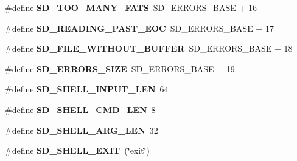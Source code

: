 \begin{DoxyCompactItemize}
\item 
\hypertarget{group__sd__public_ga5017b3273c66c328264e9c4f565df36e}{\#define {\bfseries \-S\-D\-\_\-\-T\-O\-O\-\_\-\-M\-A\-N\-Y\-\_\-\-F\-A\-T\-S}~\-S\-D\-\_\-\-E\-R\-R\-O\-R\-S\-\_\-\-B\-A\-S\-E + 16}\label{group__sd__public_ga5017b3273c66c328264e9c4f565df36e}

\item 
\hypertarget{group__sd__public_ga9e554ff6dbb9ada7d94a896533f96796}{\#define {\bfseries \-S\-D\-\_\-\-R\-E\-A\-D\-I\-N\-G\-\_\-\-P\-A\-S\-T\-\_\-\-E\-O\-C}~\-S\-D\-\_\-\-E\-R\-R\-O\-R\-S\-\_\-\-B\-A\-S\-E + 17}\label{group__sd__public_ga9e554ff6dbb9ada7d94a896533f96796}

\item 
\hypertarget{group__sd__public_gad7281660fcc6b8fdfbc982fb2e261e8d}{\#define {\bfseries \-S\-D\-\_\-\-F\-I\-L\-E\-\_\-\-W\-I\-T\-H\-O\-U\-T\-\_\-\-B\-U\-F\-F\-E\-R}~\-S\-D\-\_\-\-E\-R\-R\-O\-R\-S\-\_\-\-B\-A\-S\-E + 18}\label{group__sd__public_gad7281660fcc6b8fdfbc982fb2e261e8d}

\item 
\hypertarget{group__sd__public_ga3cb8d9a3b08f02a70a48e891cc27e05b}{\#define {\bfseries \-S\-D\-\_\-\-E\-R\-R\-O\-R\-S\-\_\-\-S\-I\-Z\-E}~\-S\-D\-\_\-\-E\-R\-R\-O\-R\-S\-\_\-\-B\-A\-S\-E + 19}\label{group__sd__public_ga3cb8d9a3b08f02a70a48e891cc27e05b}

\item 
\hypertarget{group__sd__public_ga1fae78f046859f365629f8f0622cb6c1}{\#define {\bfseries \-S\-D\-\_\-\-S\-H\-E\-L\-L\-\_\-\-I\-N\-P\-U\-T\-\_\-\-L\-E\-N}~64}\label{group__sd__public_ga1fae78f046859f365629f8f0622cb6c1}

\item 
\hypertarget{group__sd__public_ga09e51228e75ddc9f72fc095a28050228}{\#define {\bfseries \-S\-D\-\_\-\-S\-H\-E\-L\-L\-\_\-\-C\-M\-D\-\_\-\-L\-E\-N}~8}\label{group__sd__public_ga09e51228e75ddc9f72fc095a28050228}

\item 
\hypertarget{group__sd__public_ga0aac3ed8f100622099f9d62c2a01a270}{\#define {\bfseries \-S\-D\-\_\-\-S\-H\-E\-L\-L\-\_\-\-A\-R\-G\-\_\-\-L\-E\-N}~32}\label{group__sd__public_ga0aac3ed8f100622099f9d62c2a01a270}

\item 
\hypertarget{group__sd__public_gafe17b4a90dc28817a4ec21ec3c570ef5}{\#define {\bfseries \-S\-D\-\_\-\-S\-H\-E\-L\-L\-\_\-\-E\-X\-I\-T}~(\char`\"{}exit\char`\"{})}\label{group__sd__public_gafe17b4a90dc28817a4ec21ec3c570ef5}


\end{DoxyCompactItemize}
